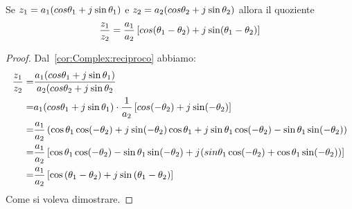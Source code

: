 \begin{thm}[Quoziente]
Se $z_1=a_1(cos\theta_1+j\mkern1mu\sin\theta_1)$ e $z_2=a_2(cos\theta_2+j\mkern1mu\sin\theta_2)$ allora il quoziente \[\dfrac{z_1}{z_2}=\dfrac{a_1}{a_2}\left[cos(\theta_1-\theta_2)+j\mkern1mu\sin(\theta_1-\theta_2)\right] \] 
\end{thm}
\begin{proof}
	Dal~\cref{cor:Complex:reciproco} abbiamo:
	\begin{align*}
	\dfrac{z_1}{z_2}=&\dfrac{a_1(cos\theta_1+j\mkern1mu\sin\theta_1)}{a_2(cos\theta_2+j\mkern1mu\sin\theta_2}\\
	=&a_1(cos\theta_1+j\mkern1mu\sin\theta_1)\cdot\dfrac{1}{a_2}\left[cos(-\theta_2)+j\mkern1mu\sin(-\theta_2) \right]\\
	=&\dfrac{a_1}{a_2}\left(\cos\theta_1\cos(-\theta_2)+j\mkern1mu\sin(-\theta_2)\cos\theta_1+j\mkern1mu\sin\theta_1\cos(-\theta_2)-\sin\theta_1\sin(-\theta_2)\right)\\
	=&\dfrac{a_1}{a_2}\left[\cos\theta_1\cos(-\theta_2)-\sin\theta_1\sin(-\theta_2)+j\mkern1mu(sin\theta_1\cos(-\theta_2)+\cos\theta_1\sin(-\theta_2))\right]\\
	=&\dfrac{a_1}{a_2}\left[\cos\left(\theta_1-\theta_2\right)+j\mkern1mu\sin\left(\theta_1-\theta_2\right)\right]
	\end{align*}
	Come si voleva dimostrare.
\end{proof}